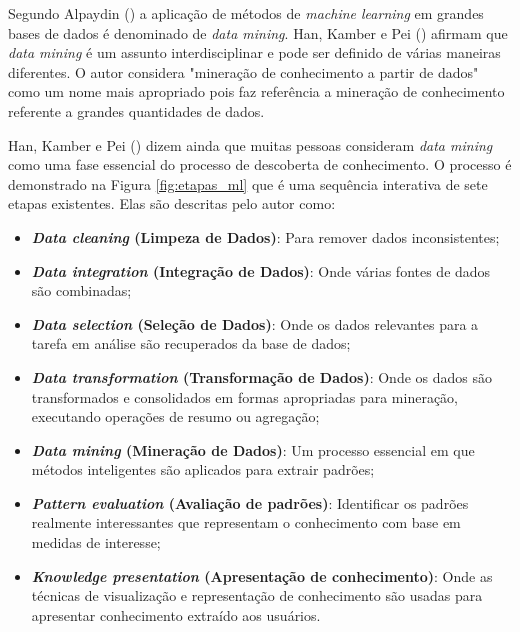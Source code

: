 Segundo Alpaydin (\citeyear{Alpaydin:2010:IML:1734076}) a aplicação de métodos de \textit{machine learning} em grandes bases de dados é denominado de \textit{data mining}. Han, Kamber e Pei (\citeyear{Han:2011:DMC:1972541}) afirmam que \textit{data mining} é um assunto interdisciplinar e pode ser definido de várias maneiras diferentes. O autor considera "mineração de conhecimento a partir de dados" como um nome mais apropriado pois faz referência a mineração de conhecimento referente a grandes quantidades de dados.

Han, Kamber e Pei (\citeyear{Han:2011:DMC:1972541}) dizem ainda que muitas pessoas consideram \textit{data mining} como uma fase essencial do processo de descoberta de conhecimento. O processo é demonstrado na Figura \ref{fig:etapas_ml} que é uma sequência interativa de sete etapas existentes. Elas são descritas pelo autor como:

\begin{itemize}
    \item \textbf{\textit{Data cleaning} (Limpeza de Dados)}: Para remover dados inconsistentes;

    \item \textbf{\textit{Data integration} (Integração de Dados)}: Onde várias fontes de dados são combinadas;

    \item \textbf{\textit{Data selection} (Seleção de Dados)}: Onde os dados relevantes para a tarefa em análise são recuperados da base de dados;

    \item \textbf{\textit{Data transformation} (Transformação de Dados)}: Onde os dados são transformados e consolidados em formas apropriadas para mineração, executando operações de resumo ou agregação;

    \item \textbf{\textit{Data mining} (Mineração de Dados)}: Um processo essencial em que métodos inteligentes são aplicados para extrair padrões;

    \item \textbf{\textit{Pattern evaluation} (Avaliação de padrões)}: Identificar os padrões realmente interessantes que representam o conhecimento com base em medidas de interesse;

    \item \textbf{\textit{Knowledge presentation} (Apresentação de conhecimento)}: Onde as técnicas de visualização e representação de conhecimento são usadas para apresentar conhecimento extraído aos usuários.

\end{itemize}

